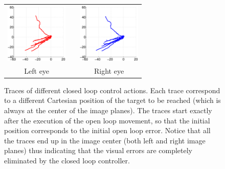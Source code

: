 \begin{figure}
  \begin{center}
	\begin{tabular}{ccc}
	  \parbox{30mm}{\includegraphics[width=30mm]{Figure/LeftEyeClosedLoop.eps}}  & \hspace{.1cm} &
	  \parbox{30mm}{\includegraphics[width=30mm]{Figure/RightEyeClosedLoop.eps}}
	  \\
	  \parbox{30mm}{\centering Left eye } & \hspace{0.1cm} & \parbox{30mm}{\centering Right eye }
  \end{tabular}
\end{center}
\caption{Traces of different closed loop control actions. Each trace correspond to a different Cartesian position of the target to be reached (which 
is always at the center of the image planes). The traces start exactly after the execution of the open loop movement, so that the initial position corresponds to the initial open loop error. Notice that all the traces end up in the image center (both left and right image planes) thus indicating that the visual errors are completely eliminated by the closed loop controller.}\label{Fig:ImagePlaneClosedLoopErrors}
  \end{figure}

